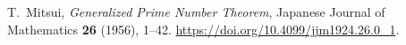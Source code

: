 T.~Mitsui,
\emph{Generalized Prime Number Theorem},
Japanese Journal of Mathematics \textbf{26} (1956), 1--42.
\url{https://doi.org/10.4099/jjm1924.26.0_1}.
